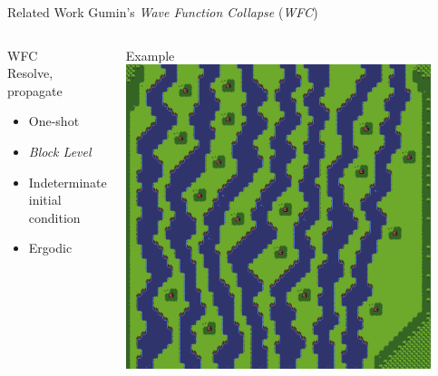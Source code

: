 \documentclass{beamer}
\begin{document}


  \begin{frame}[fragile]{Related Work}
    Gumin's \textit{Wave Function Collapse} (\textit{WFC})
    \begin{columns}[T,onlytextwidth]
        \begin{block}{WFC}
          \hfill \\
          Resolve, propagate
          \begin{itemize}
            \item One-shot
            \item \textit{Block Level}
            \item Indeterminate initial condition
            \item Ergodic
          \end{itemize}
        \end{block}
        \begin{block}{Example}
          \includegraphics[width=0.9\textwidth]{img/forestmicro_64x64.pdf}
        \end{block}
    \end{columns}
  \end{frame}
\end{document}
